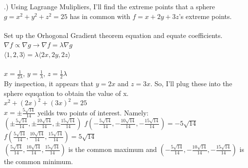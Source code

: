 \documentclass[12pt]{article}
\begin{document}
.) Using Lagrange Mulipliers, I'll find the extreme points that a sphere $g = x^{2} + y^{2} + z^{2} = 25$ has in common with $f = x+2y + 3z$'s extreme points.\\\\
\noindent Set up the Orhogonal Gradient theorem equation and equate coefficients. \\
\noindent $\nabla f \propto \nabla g \rightarrow \nabla f = \lambda \nabla g$\\
\noindent $ \langle 1, 2, 3\rangle = \lambda \langle 2x, 2y, 2z\rangle$\\\\
\noindent $x = \frac{1}{2\lambda}$, \hspace{10pt} $y = \frac{1}{\lambda}$, \hspace{10pt} $z = \frac{1}{2}\lambda$\\
\noindent By inspection, it appears that $y = 2x$ and $z = 3x$. So, I'll plug these into the sphere equqation to obtain the value of x.\\
\noindent $x^{2} + (2x)^{2} + (3x)^{2} = 25$\\
\noindent $x = \pm \frac{5\sqrt{14}}{14}$ yeilds two points of interest. Namely: \\
\noindent $(\pm \frac{5\sqrt{14}}{14}, \pm \frac{10\sqrt{14}}{14}, \pm \frac{15\sqrt{14}}{14})$
\noindent $f(- \frac{5\sqrt{14}}{14}, - \frac{10\sqrt{14}}{14},  -\frac{15\sqrt{14}}{14}) = -5\sqrt{14}$\\
\noindent $f( \frac{5\sqrt{14}}{14},  \frac{10\sqrt{14}}{14},  \frac{15\sqrt{14}}{14}) = 5\sqrt{14}$\\
\noindent $(\frac{5\sqrt{14}}{14},  \frac{10\sqrt{14}}{14},  \frac{15\sqrt{14}}{14})$ is the common maximum and $(- \frac{5\sqrt{14}}{14}, - \frac{10\sqrt{14}}{14},  -\frac{15\sqrt{14}}{14})$ is the common minimum. \\\\
\end{document}
